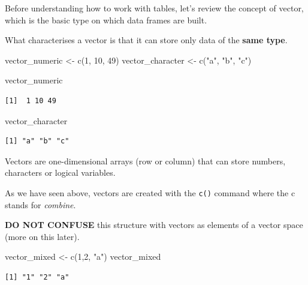 \documentclass[
  letterpaper,
  DIV=11,
  numbers=noendperiod]{scrartcl}
\newenvironment{Shaded}{\begin{snugshade}}{\end{snugshade}}
\newcommand{\DecValTok}[1]{\textcolor[rgb]{0.68,0.00,0.00}{#1}}
\newcommand{\FunctionTok}[1]{\textcolor[rgb]{0.28,0.35,0.67}{#1}}
\newcommand{\NormalTok}[1]{\textcolor[rgb]{0.00,0.23,0.31}{#1}}
\newcommand{\OtherTok}[1]{\textcolor[rgb]{0.00,0.23,0.31}{#1}}
\newcommand{\StringTok}[1]{\textcolor[rgb]{0.13,0.47,0.30}{#1}}
\begin{document}
Before understanding how to work with tables, let's review the concept
of vector, which is the basic type on which data frames are built.

What characterises a vector is that it can store only data of the
\textbf{same type}.

\begin{Shaded}
\begin{Highlighting}[]
\NormalTok{vector\_numeric }\OtherTok{\textless{}{-}} \FunctionTok{c}\NormalTok{(}\DecValTok{1}\NormalTok{, }\DecValTok{10}\NormalTok{, }\DecValTok{49}\NormalTok{)}
\NormalTok{vector\_character }\OtherTok{\textless{}{-}} \FunctionTok{c}\NormalTok{(}\StringTok{"a"}\NormalTok{, }\StringTok{"b"}\NormalTok{, }\StringTok{"c"}\NormalTok{)}

\NormalTok{vector\_numeric}
\end{Highlighting}
\end{Shaded}

\begin{verbatim}
[1]  1 10 49
\end{verbatim}

\begin{Shaded}
\begin{Highlighting}[]
\NormalTok{vector\_character}
\end{Highlighting}
\end{Shaded}

\begin{verbatim}
[1] "a" "b" "c"
\end{verbatim}

Vectors are one-dimensional arrays (row or column) that can store
numbers, characters or logical variables.

As we have seen above, vectors are created with the \texttt{c()} command
where the c stands for \emph{combine}.

\textbf{DO NOT CONFUSE} this structure with vectors as elements of a
vector space (more on this later).

\begin{Shaded}
\begin{Highlighting}[]
\NormalTok{vector\_mixed }\OtherTok{\textless{}{-}} \FunctionTok{c}\NormalTok{(}\DecValTok{1}\NormalTok{,}\DecValTok{2}\NormalTok{, }\StringTok{"a"}\NormalTok{)}
\NormalTok{vector\_mixed}
\end{Highlighting}
\end{Shaded}

\begin{verbatim}
[1] "1" "2" "a"
\end{verbatim}
\end{document}

